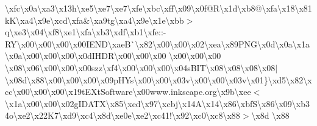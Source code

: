 \textbackslash{}xfc\textbackslash{}x0a\textbackslash{}xa3\textbackslash{}x13h\textbackslash{}xe5\textbackslash{}xe7\textbackslash{}xe7\textbackslash{}xfe\textbackslash{}xbc\textbackslash{}xff\textbackslash{}x09\textbackslash{}x0f@\+R\textbackslash{}x1d\textbackslash{}xb8@\textbackslash{}xfa\textbackslash{}x18\textbackslash{}x81k\+K\textbackslash{}xa4\textbackslash{}x9e\textbackslash{}xcd\textbackslash{}xfa\&\textbackslash{}xa9tg\textbackslash{}xa4\textbackslash{}x9e\textbackslash{}x1e\textbackslash{}xbb$>$q\textbackslash{}xe3\textbackslash{}x04\textbackslash{}xf8\textbackslash{}xe1\textbackslash{}xfa\textbackslash{}xb3\textbackslash{}xdf\textbackslash{}xb1\textquotesingle{}\textbackslash{}xfe\+::-\/\+R\+Y\textbackslash{}x00\textbackslash{}x00\textbackslash{}x00\textbackslash{}x00\+I\+E\+N\+D\textbackslash{}xae\+B\`{}\textbackslash{}x82\textbackslash{}x00\textbackslash{}x00\textbackslash{}x02\textbackslash{}xea\textbackslash{}x89\+P\+N\+G\textbackslash{}x0d\textbackslash{}x0a\textbackslash{}x1a\textbackslash{}x0a\textbackslash{}x00\textbackslash{}x00\textbackslash{}x00\textbackslash{}x0d\+I\+H\+D\+R\textbackslash{}x00\textbackslash{}x00\textbackslash{}x00 \textbackslash{}x00\textbackslash{}x00\textbackslash{}x00 \textbackslash{}x08\textbackslash{}x06\textbackslash{}x00\textbackslash{}x00\textbackslash{}x00szz\textbackslash{}xf4\textbackslash{}x00\textbackslash{}x00\textbackslash{}x00\textbackslash{}x04s\+B\+I\+T\textbackslash{}x08\textbackslash{}x08\textbackslash{}x08\textbackslash{}x08$\vert$\textbackslash{}x08d\textbackslash{}x88\textbackslash{}x00\textbackslash{}x00\textbackslash{}x00\textbackslash{}x09p\+H\+Ys\textbackslash{}x00\textbackslash{}x00\textbackslash{}x03v\textbackslash{}x00\textbackslash{}x00\textbackslash{}x03v\textbackslash{}x01\}\textbackslash{}xd5\textbackslash{}x82\textbackslash{}xcc\textbackslash{}x00\textbackslash{}x00\textbackslash{}x00\textbackslash{}x19t\+E\+Xt\+Software\textbackslash{}x00www.\+inkscape.\+org\textbackslash{}x9b\textbackslash{}xee$<$\textbackslash{}x1a\textbackslash{}x00\textbackslash{}x00\textbackslash{}x02g\+I\+D\+A\+T\+X\textbackslash{}x85\textbackslash{}xed\textbackslash{}x97\textbackslash{}xcbj\textbackslash{}x14\+A\textbackslash{}x14\textbackslash{}x86\textbackslash{}xbf\+S\textbackslash{}x86\textbackslash{}x09\textbackslash{}xb34o\textbackslash{}xe2\textbackslash{}x22\+K7\textbackslash{}xd9\textbackslash{}xc4\textbackslash{}x8d\textbackslash{}xe0e\textbackslash{}xe2\textbackslash{}xc41!\textbackslash{}x92\textbackslash{}xc0\textbackslash{}xc8\textbackslash{}x88$>$\textbackslash{}x8d \textbackslash{}x88 